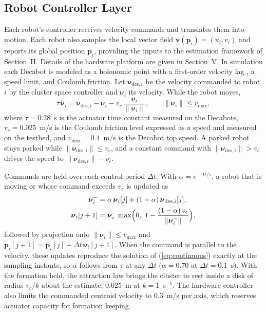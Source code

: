 \documentclass[lettersize,journal]{IEEEtran}
\begin{document}
\subsection{Robot Controller Layer}

Each robot's controller receives velocity commands and translates them into motion. Each robot also samples the local vector field $\mathbf{v}(\mathbf{p}_i) = (u_i, v_i)$ and reports its global position $\mathbf{p}_i$, providing the inputs to the estimation framework of Section~II. Details of the hardware platform are given in Section~V. In simulation each Decabot is modeled as a holonomic point with a first-order velocity lag \cite{4,7}, a speed limit, and Coulomb friction. Let $\boldsymbol{\nu}_{\text{des},i}$ be the velocity commanded to robot $i$ by the cluster space controller and $\boldsymbol{\nu}_i$ its velocity. While the robot moves,
\begin{equation}
\tau\,\dot{\boldsymbol{\nu}}_i = \boldsymbol{\nu}_{\text{des},i} - \boldsymbol{\nu}_i - v_c\,\frac{\boldsymbol{\nu}_i}{\|\boldsymbol{\nu}_i\|}, \qquad \|\boldsymbol{\nu}_i\| \le v_{\max},
\label{eq:continuous}
\end{equation}
where $\tau = 0.28$~s is the actuator time constant measured on the Decabots, $v_c = 0.025$~m/s is the Coulomb friction level expressed as a speed and measured on the testbed, and $v_{\max} = 0.4$~m/s is the Decabot top speed. A parked robot stays parked while $\|\boldsymbol{\nu}_{\text{des},i}\| \le v_c$, and a constant command with $\|\boldsymbol{\nu}_{\text{des},i}\| > v_c$ drives the speed to $\|\boldsymbol{\nu}_{\text{des},i}\| - v_c$.

Commands are held over each control period $\Delta t$. With $\alpha = e^{-\Delta t/\tau}$, a robot that is moving or whose command exceeds $v_c$ is updated as
\begin{align}
\boldsymbol{\nu}_i^{-} &= \alpha\,\boldsymbol{\nu}_i[j] + (1-\alpha)\,\boldsymbol{\nu}_{\text{des},i}[j], \label{eq:momentum}\\
\boldsymbol{\nu}_i[j+1] &= \boldsymbol{\nu}_i^{-}\max\Bigl(0,\ 1 - \frac{(1-\alpha)\,v_c}{\|\boldsymbol{\nu}_i^{-}\|}\Bigr), \label{eq:friction}
\end{align}
followed by projection onto $\|\boldsymbol{\nu}_i\| \le v_{\max}$ and $\mathbf{p}_i[j+1] = \mathbf{p}_i[j] + \Delta t\,\boldsymbol{\nu}_i[j+1]$. When the command is parallel to the velocity, these updates reproduce the solution of (\ref{eq:continuous}) exactly at the sampling instants, so $\alpha$ follows from $\tau$ at any $\Delta t$ ($\alpha = 0.70$ at $\Delta t = 0.1$~s). With the formation held, the attraction law brings the cluster to rest inside a disk of radius $v_c/k$ about the estimate, 0.025~m at $k = 1$~s$^{-1}$. The hardware controller also limits the commanded centroid velocity to 0.3~m/s per axis, which reserves actuator capacity for formation keeping.
\end{document}
